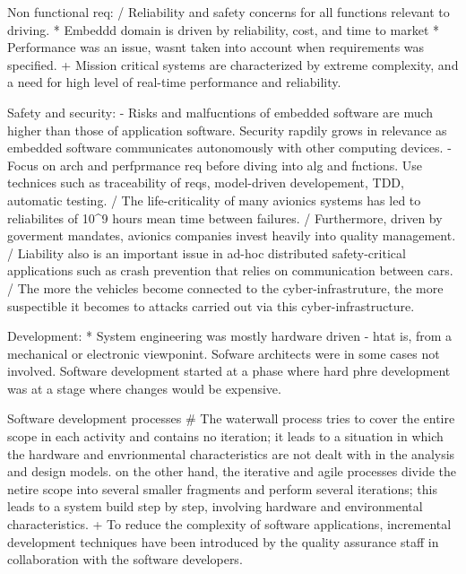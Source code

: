 Non functional req:
/ Reliability and safety concerns for all functions relevant to driving.
* Embeddd domain is driven by reliability, cost, and time to market
* Performance was an issue, wasnt taken into account when requirements was specified. 
+ Mission critical systems are characterized by extreme complexity, and a need for high level of real-time performance and reliability.


Safety and security: 
- Risks and malfucntions of embedded software are much higher than those of application software. Security rapdily grows in relevance as embedded software communicates autonomously with other computing devices.
- Focus on arch and perfprmance req before diving into alg and fnctions. Use technices such as traceability of reqs, model-driven developement, TDD, automatic testing.
/ The life-criticality of many avionics systems has led to reliabilites of 10^9 hours mean time between failures. 
/ Furthermore, driven by goverment mandates, avionics companies invest heavily into quality management. 
/ Liability also is an important issue in ad-hoc distributed safety-critical applications such as crash prevention that relies on communication between cars. 
/ The more the vehicles become connected to the cyber-infrastruture, the more suspectible it becomes to attacks carried out via this cyber-infrastructure.

Development:
* System engineering was mostly hardware driven - htat is, from a mechanical or electronic viewponint. Sofware architects were in some cases not involved. Software development started at a phase where hard phre development was at a stage where changes would be expensive.


Software development processes
# The waterwall process tries to cover the entire scope in each activity and contains no iteration; it leads to a situation in which the hardware and envrionmental characteristics are not dealt with in the analysis and design models. on the other hand, the iterative and agile processes divide the netire scope into several smaller fragments and perform several iterations; this leads to a system build step by step, involving hardware and environmental characteristics.
+ To reduce the complexity of software applications, incremental development techniques have been introduced by the quality assurance staff in collaboration with the software developers.







































